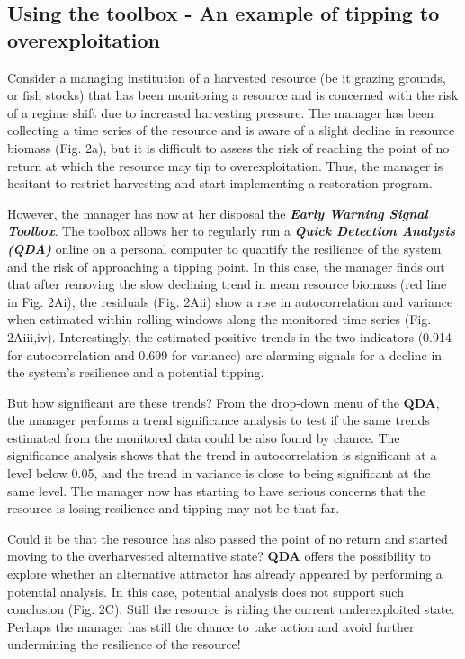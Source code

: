 \documentclass[12pt,a4paper,final]{article}
\begin{document}
\subsection{Using the toolbox - An example of tipping to overexploitation}
Consider a managing institution of a harvested resource (be it grazing grounds, or fish stocks) that has been monitoring a resource and is concerned with the risk of a regime shift due to increased harvesting pressure. The manager has been collecting a time series of the resource and is aware of a slight decline in resource biomass (Fig. 2a), but it is difficult to assess the risk of reaching the point of no return at which the resource may tip to overexploitation. Thus, the manager is hesitant to restrict harvesting and start implementing a restoration program. 

However, the manager has now at her disposal the \textbf{\textit{Early Warning Signal Toolbox}}. The toolbox allows her to regularly run a \textbf{\textit{Quick Detection Analysis (QDA)}} online on a personal computer to quantify the resilience of the system and the risk of approaching a tipping point. In this case, the manager finds out that after removing the slow declining trend in mean resource biomass (red line in Fig. 2Ai), the residuals (Fig. 2Aii) show a rise in autocorrelation and variance when estimated within rolling windows along the monitored time series (Fig. 2Aiii,iv). %
Interestingly, the estimated positive trends in the two indicators (0.914 for autocorrelation and 0.699 for variance) are alarming signals for a decline in the system's resilience and a potential tipping. 

But how significant are these trends? From the drop-down menu of the \textbf{QDA}, the manager performs a trend significance analysis to test if the same trends estimated from the monitored data could be also found by chance. The significance analysis shows that the trend in autocorrelation is significant at a level below 0.05, and the trend in variance is close to being significant at the same level. The manager now has starting to have serious concerns that the resource is losing resilience and tipping may not be that far. 

Could it be that the resource has also passed the point of no return and started moving to the overharvested alternative state? \textbf{QDA} offers the possibility to explore whether an alternative attractor has already appeared by performing a potential analysis. In this case, potential analysis does not support such conclusion (Fig. 2C). Still the resource is riding the current underexploited state. Perhaps the manager has still the chance to take action and avoid further undermining the resilience of the resource!\\
\end{document}
